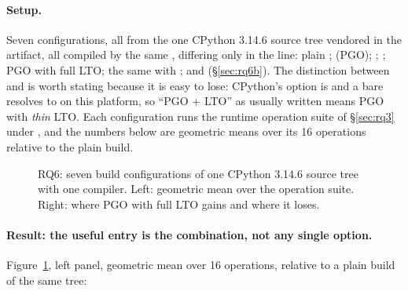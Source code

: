 
\paragraph{Setup.} Seven configurations, all from the one CPython 3.14.6 source tree
vendored in the artifact, all compiled by the same , differing only in the
 line: plain ;  (PGO);
; ; PGO with full LTO; the same with
; and  (\S\ref{sec:rq6b}). The
distinction between  and  is worth stating because it is easy to lose:
CPython's option is  and a bare  resolves
to  on this platform, so ``PGO + LTO'' as usually written means PGO with
\emph{thin} LTO. Each configuration runs the runtime operation suite of \S\ref{sec:rq3} under
, and the numbers below are geometric means over its 16 operations relative to the
plain build.

\begin{figure}[t]
  \centering
  \caption{RQ6: seven build configurations of one CPython 3.14.6 source tree with one
    compiler. Left: geometric mean over the operation suite. Right: where PGO with full LTO
    gains and where it loses.}
  \label{fig:realbuilds}
\end{figure}

\paragraph{Result: the useful entry is the combination, not any single option.}
Figure~\ref{fig:realbuilds}, left panel, geometric mean over 16
operations, relative to a plain  build of the same tree:

